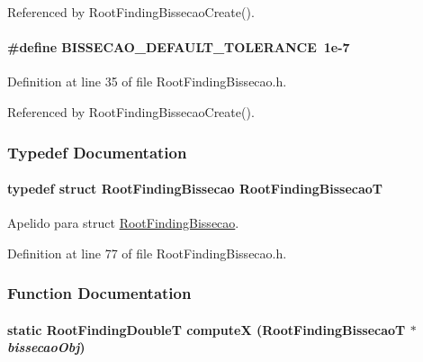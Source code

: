 Referenced by RootFindingBissecaoCreate().\hypertarget{group____bissecao_g69c6773347f58386687f3b4bcdad0e01}{
\paragraph[BISSECAO\_\-DEFAULT\_\-TOLERANCE]{\setlength{\rightskip}{0pt plus 5cm}\#define BISSECAO\_\-DEFAULT\_\-TOLERANCE~1e-7}\hfill}
\label{group____bissecao_g69c6773347f58386687f3b4bcdad0e01}




Definition at line 35 of file RootFindingBissecao.h.

Referenced by RootFindingBissecaoCreate().

\subsubsection{Typedef Documentation}
\hypertarget{group____bissecao_gb3511b238887380d8ad7579693f400d1}{
\paragraph[RootFindingBissecaoT]{\setlength{\rightskip}{0pt plus 5cm}typedef struct {\bf RootFindingBissecao} {\bf RootFindingBissecaoT}}\hfill}
\label{group____bissecao_gb3511b238887380d8ad7579693f400d1}


Apelido para struct \hyperlink{structRootFindingBissecao}{RootFindingBissecao}. 



Definition at line 77 of file RootFindingBissecao.h.

\subsubsection{Function Documentation}
\hypertarget{group____bissecao_g9edf187b4ec1c46191fc8d208f506247}{
\paragraph[computeX]{\setlength{\rightskip}{0pt plus 5cm}static {\bf RootFindingDoubleT} computeX ({\bf RootFindingBissecaoT} $\ast$ {\em bissecaoObj})}\hfill}
\label{group____bissecao_g9edf187b4ec1c46191fc8d208f506247}


